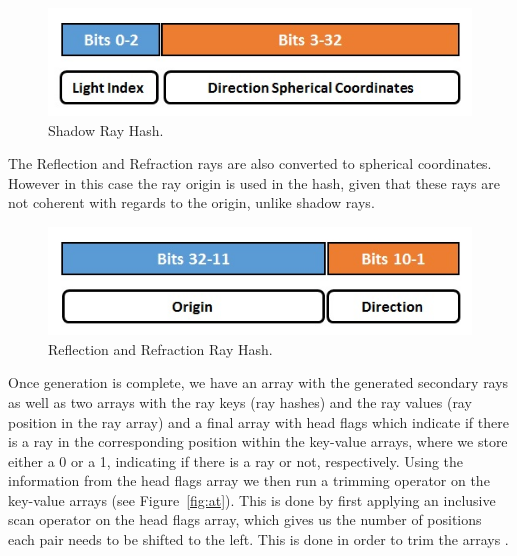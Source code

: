 \documentclass{egpubl}
\begin{document}
\begin{figure}[!htb]
    \centering
    \includegraphics[scale=0.50]{images/hash-shadow-ray.jpg}
    \caption{\label{fig:sr}Shadow Ray Hash.}
\end{figure}

The Reflection and Refraction rays are also converted to spherical coordinates. However in this case the ray origin is used in the hash, given that these rays are not coherent with regards to the origin, unlike shadow rays.

\begin{figure}[!htb]
    \centering
    \includegraphics[scale=0.50]{images/hash-ordinary-ray.jpg}
    \caption{\label{fig:rr}Reflection and Refraction Ray Hash.}
\end{figure}

Once generation is complete, we have an array with the generated secondary rays as well as two arrays with the ray keys (ray hashes) and the ray values (ray position in the ray array) and a final array with head flags which indicate if there is a ray in the corresponding position within the key-value arrays, where we store either a 0 or a 1, indicating if there is a ray or not, respectively.
Using the information from the head flags array we then run a trimming operator on the key-value arrays (see Figure~\ref{fig:at}). This is done by first applying an inclusive scan operator \cite{Merrill09} on the head flags array, which gives us the number of positions each pair needs to be shifted to the left. This is done in order to trim the arrays \cite{GPUGems2}.
\end{document}

